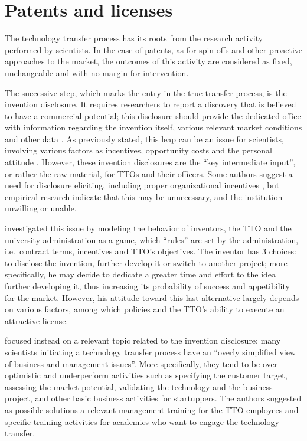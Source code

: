 \section{Patents and licenses}

The technology transfer process has its roots from the research activity performed by scientists. In the case of patents, as for spin-offs and other proactive approaches to the market, the outcomes of this activity are considered as fixed, unchangeable and with no margin for intervention. 

The successive step, which marks the entry in the true transfer process, is the invention disclosure. It requires researchers to report a discovery that is believed to have a commercial potential; this disclosure should provide the dedicated office with information regarding the invention itself, various relevant market conditions and other data \citep{Thursby2002}. As previously stated, this leap can be an issue for scientists, involving various factors as incentives, opportunity costs and the personal attitude \citep{OwenSmith2001}. However, these invention disclosures are the \enquote{key intermediate input}, or rather the raw material, for TTOs and their officers. Some authors suggest a need for disclosure eliciting, including proper organizational incentives \citep{Siegel2003a}, but empirical research indicate that this may be unnecessary, and the institution unwilling or unable. 

\citet{Jensen2003} investigated this issue by modeling the behavior of inventors, the TTO and the university administration as a game, which \enquote{rules} are set by the administration, i.e.\ contract terms, incentives and TTO's objectives. The inventor has 3 choices: to disclose the invention, further develop it or switch to another project; more specifically, he may decide to dedicate a greater time and effort to the idea further developing it, thus increasing its probability of success and appetibility for the market. However, his attitude toward this last alternative largely depends on various factors, among which policies and the TTO's ability to execute an attractive license.

\citet{McAdam2005} focused instead on a relevant topic related to the invention disclosure: many scientists initiating a technology transfer process have an \enquote{overly simplified view of business and management issues}. More specifically, they tend to be over optimistic and underperform activities such as specifying the customer target, assessing the market potential, validating the technology and the business project, and other basic business activities for startuppers. The authors suggested as possible solutions a relevant management training for the TTO employees and specific training activities for academics who want to engage the technology transfer.


